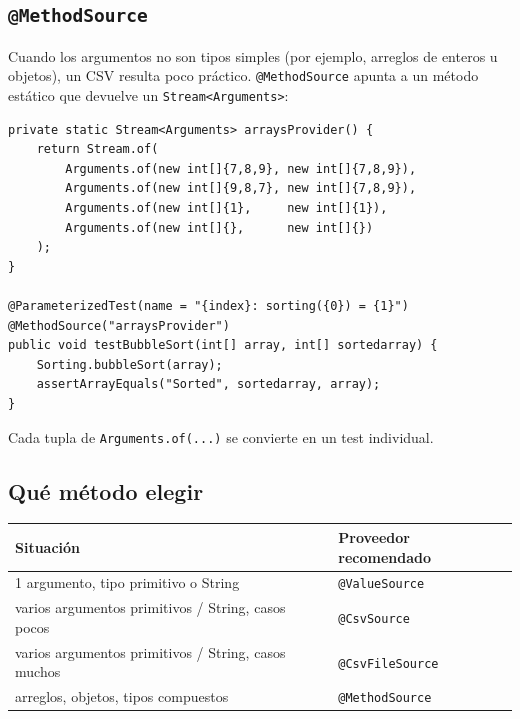 \documentclass[12pt,a4paper]{article}
\begin{document}
\subsection{\texttt{@MethodSource}}
Cuando los argumentos no son tipos simples (por ejemplo, arreglos de enteros u objetos), un CSV resulta poco práctico. \texttt{@MethodSource} apunta a un método estático que devuelve un \texttt{Stream<Arguments>}:
\begin{lstlisting}[style=javastyle]
private static Stream<Arguments> arraysProvider() {
    return Stream.of(
        Arguments.of(new int[]{7,8,9}, new int[]{7,8,9}),
        Arguments.of(new int[]{9,8,7}, new int[]{7,8,9}),
        Arguments.of(new int[]{1},     new int[]{1}),
        Arguments.of(new int[]{},      new int[]{})
    );
}

@ParameterizedTest(name = "{index}: sorting({0}) = {1}")
@MethodSource("arraysProvider")
public void testBubbleSort(int[] array, int[] sortedarray) {
    Sorting.bubbleSort(array);
    assertArrayEquals("Sorted", sortedarray, array);
}
\end{lstlisting}
Cada tupla de \texttt{Arguments.of(...)} se convierte en un test individual.

\subsection{Qué método elegir}
\begin{center}
\begin{tabular}{ll}
\toprule
Situación & Proveedor recomendado \\
\midrule
1 argumento, tipo primitivo o String                & \texttt{@ValueSource} \\
varios argumentos primitivos / String, casos pocos  & \texttt{@CsvSource} \\
varios argumentos primitivos / String, casos muchos & \texttt{@CsvFileSource} \\
arreglos, objetos, tipos compuestos                 & \texttt{@MethodSource} \\
\bottomrule
\end{tabular}
\end{center}
\end{document}
